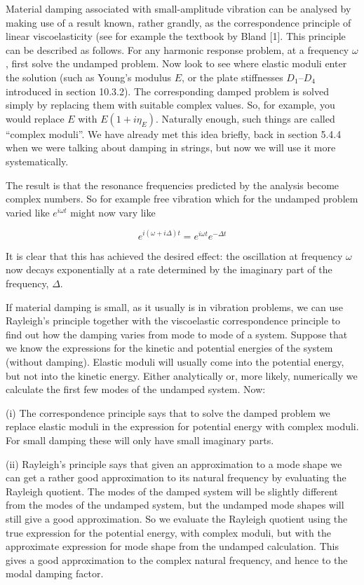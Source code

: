   Material damping associated with small-amplitude vibration can be analysed by 
  making use of a result known, rather grandly, as the correspondence principle 
  of linear viscoelasticity (see for example the textbook by Bland [1]. This 
  principle can be described as follows. For any harmonic response problem, at 
  a frequency $\omega$, first solve the undamped problem. Now look to see where 
  elastic moduli enter the solution (such as Young's modulus $E$, or the plate 
  stiffnesses $D_1$--$D_4$ introduced in section 10.3.2). The corresponding 
  damped problem is solved simply by replacing them with suitable complex 
  values. So, for example, you would replace $E$ with $E(1+i \eta_E)$. 
  Naturally enough, such things are called ``complex moduli''. We have already 
  met this idea briefly, back in section 5.4.4 when we were talking about 
  damping in strings, but now we will use it more systematically. 

  The result is that the resonance frequencies predicted by the analysis become 
  complex numbers. So for example free vibration which for the undamped problem 
  varied like $e^{i \omega t}$ might now vary like 

  $$e^{i(\omega + i \Delta)t} = e^{i \omega t} e^{-\Delta t} \tag{1}$$ 

  It is clear that this has achieved the desired effect: the oscillation at 
  frequency $\omega$ now decays exponentially at a rate determined by the 
  imaginary part of the frequency, $\Delta$. 

  If material damping is small, as it usually is in vibration problems, we can 
  use Rayleigh's principle together with the viscoelastic correspondence 
  principle to find out how the damping varies from mode to mode of a system. 
  Suppose that we know the expressions for the kinetic and potential energies 
  of the system (without damping). Elastic moduli will usually come into the 
  potential energy, but not into the kinetic energy. Either analytically or, 
  more likely, numerically we calculate the first few modes of the undamped 
  system. Now: 

  (i)	The correspondence principle says that to solve the damped problem we 
  replace elastic moduli in the expression for potential energy with complex 
  moduli. For small damping these will only have small imaginary parts. 

  (ii)	Rayleigh's principle says that given an approximation to a mode shape we 
  can get a rather good approximation to its natural frequency by evaluating 
  the Rayleigh quotient. The modes of the damped system will be slightly 
  different from the modes of the undamped system, but the undamped mode shapes 
  will still give a good approximation. So we evaluate the Rayleigh quotient 
  using the true expression for the potential energy, with complex moduli, but 
  with the approximate expression for mode shape from the undamped calculation. 
  This gives a good approximation to the complex natural frequency, and hence 
  to the modal damping factor. 

